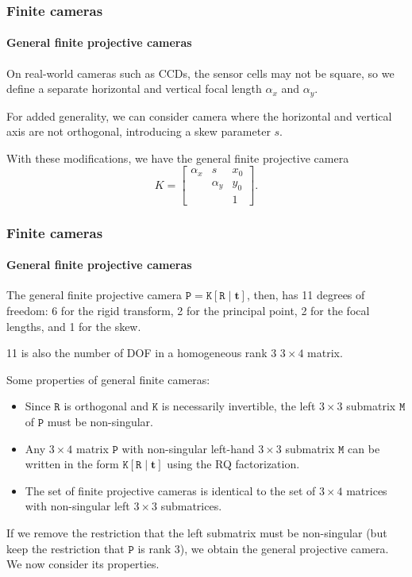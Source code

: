 \documentclass[aspectratio=169]{beamer}
\renewcommand{\vec}[1]{\boldsymbol{#1}}
\newcommand{\mat}[1]{\mathtt{#1}}
\begin{document}
\begin{frame}
\frametitle{Finite cameras}
\framesubtitle{General finite projective cameras}

On real-world cameras such as CCDs, the sensor cells may not be
square, so we define a \alert{separate horizontal and vertical focal
  length} $\alpha_x$ and $\alpha_y$.

\medskip

For added generality, we can consider camera where the horizontal and
vertical axis are not orthogonal, introducing a \alert{skew} parameter
$s$.

\medskip

With these modifications, we have the \alert{general finite projective
camera}
\begin{equation*}
K = 
\begin{bmatrix}
\alpha_x & s & x_0 \\ & \alpha_y & y_0 \\ & & 1
\end{bmatrix}.
\end{equation*}

\end{frame}

\begin{frame}
\frametitle{Finite cameras}
\framesubtitle{General finite projective cameras}

The general finite projective camera $\mat{P}=\mat{K}[\mat{R}
\mid \vec{t}]$, then, has 11 degrees of freedom: 6 for the rigid
transform, 2 for the principal point, 2 for the focal lengths, and 1
for the skew.

\medskip

11 is also the number of DOF in a homogeneous rank 3 $3\times 4$
matrix.

\medskip

Some properties of general finite cameras:
\begin{itemize}
\item Since $\mat{R}$ is orthogonal and $\mat{K}$ is necessarily
  invertible, the left $3\times 3$ submatrix $\mat{M}$ of $\mat{P}$
  must be non-singular.
\item Any $3\times 4$ matrix $\mat{P}$ with non-singular left-hand
  $3\times 3$ submatrix $\mat{M}$ can be written in the form
  $\mat{K}[\mat{R} \mid \vec{t}]$ using the RQ factorization.
\item The set of finite projective cameras is identical to the set of
  $3\times 4$ matrices with non-singular left $3\times 3$ submatrices.
\end{itemize}

\medskip

If we remove the restriction that the left submatrix must be
non-singular (but keep the restriction that $\mat{P}$ is rank 3), we
obtain the \alert{general projective camera}.  We now consider its
properties.

\end{frame}
\end{document}
